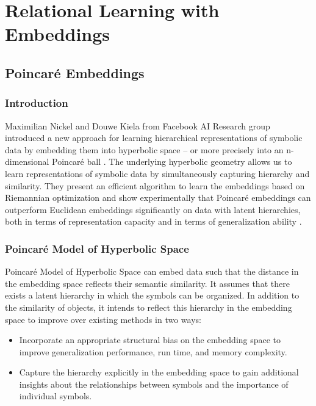 
\chapter{Relational Learning with Embeddings}

\section{Poincaré Embeddings}


\subsection{Introduction}

Maximilian Nickel and Douwe Kiela from Facebook AI Research group introduced a new approach for learning hierarchical representations of symbolic data by embedding them into hyperbolic space – or more precisely into an n-dimensional Poincaré ball \cite{NIPS2017_7213}. The underlying hyperbolic geometry allows us to learn representations of symbolic data by simultaneously capturing hierarchy and similarity. They present an efficient algorithm to learn the embeddings based on Riemannian optimization and show experimentally that Poincaré embeddings can outperform Euclidean embeddings significantly on data with latent hierarchies, both in terms of representation capacity and in terms of generalization ability .

\subsection{Poincaré Model of Hyperbolic Space}

Poincaré Model of Hyperbolic Space can embed data such that the distance in the embedding space reflects their semantic similarity. It assumes that there exists a latent hierarchy in which the symbols can be organized. In addition to the similarity of objects, it intends to reflect this hierarchy in the embedding space to improve over existing methods in two ways:
\begin{itemize}
    \item Incorporate an appropriate structural bias on the embedding space to improve generalization performance, run time, and memory complexity.
    \item Capture the hierarchy explicitly in the embedding space to gain additional insights about the relationships between symbols and the importance of individual symbols.
\end{itemize}

